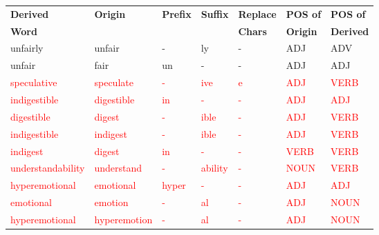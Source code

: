 \documentclass[11pt]{article}
\begin{document}
\begin{enumerate}
  \begin{center}
 \small
  \begin{tabular}{|l|l||l|l|l|l||l|} \hline
  \textbf{Derived} & \textbf{Origin} & \textbf{Prefix} & \textbf{Suffix} & 
  \textbf{Replace} & \textbf{POS of} & \textbf{POS of} \\
  \textbf{Word} & ~ & ~ & ~ & \textbf{Chars} & \textbf{Origin} &
  \textbf{Derived} \\ \hline
   unfairly & unfair & - & ly  & - & ADJ & ADV \\
   unfair & fair & un & - & - & ADJ & ADJ \\  \hline \hline
   \textcolor{red}{speculative}& \textcolor{red}{speculate}& \textcolor{red}{-} & \textcolor{red}{ive}  & \textcolor{red}{e}& \textcolor{red}{ADJ} & \textcolor{red}{VERB}\\  \hline \hline
   \textcolor{red}{indigestible} & \textcolor{red}{digestible} & \textcolor{red}{in} & \textcolor{red}{-} & \textcolor{red}{-} & \textcolor{red}{ADJ} & \textcolor{red}{ADJ} \\
   \textcolor{red}{digestible} & \textcolor{red}{digest} & \textcolor{red}{-} & \textcolor{red}{ible} & \textcolor{red}{-} & \textcolor{red}{ADJ} & \textcolor{red}{VERB} \\
   \textcolor{red}{indigestible} & \textcolor{red}{indigest} & \textcolor{red}{-} & \textcolor{red}{ible} & \textcolor{red}{-} & \textcolor{red}{ADJ} &  \textcolor{red}{VERB} \\
   \textcolor{red}{indigest} & \textcolor{red}{digest} & \textcolor{red}{in} & \textcolor{red}{-} & \textcolor{red}{-} & \textcolor{red}{VERB} & \textcolor{red}{VERB} \\ \hline \hline
   \textcolor{red}{understandability}& \textcolor{red}{understand} & \textcolor{red}{-} & \textcolor{red}{ability} & \textcolor{red}{-} & \textcolor{red}{NOUN} & \textcolor{red}{VERB} \\ \hline \hline
   \textcolor{red}{hyperemotional} & \textcolor{red}{emotional} & \textcolor{red}{hyper}& \textcolor{red}{-} & \textcolor{red}{-} & \textcolor{red}{ADJ} & \textcolor{red}{ADJ} \\
   \textcolor{red}{emotional} & \textcolor{red}{emotion} & \textcolor{red}{-}& \textcolor{red}{al} & \textcolor{red}{-} & \textcolor{red}{ADJ} & \textcolor{red}{NOUN} \\
   \textcolor{red}{hyperemotional} & \textcolor{red}{hyperemotion} & \textcolor{red}{-}& \textcolor{red}{al} & \textcolor{red}{-} & \textcolor{red}{ADJ} & \textcolor{red}{NOUN} \\

\end{tabular}
\end{center}
\end{enumerate}
\end{document}
